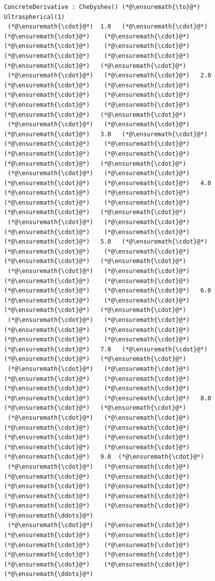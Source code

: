 \documentclass[12pt,a4paper]{article}
\begin{document}
\begin{lstlisting}
ConcreteDerivative : Chebyshev() (*@\ensuremath{\to}@*) Ultraspherical(1)
 (*@\ensuremath{\cdot}@*)  1.0   (*@\ensuremath{\cdot}@*)    (*@\ensuremath{\cdot}@*)    (*@\ensuremath{\cdot}@*)    (*@\ensuremath{\cdot}@*)    (*@\ensuremath{\cdot}@*)    (*@\ensuremath{\cdot}@*)    (*@\ensuremath{\cdot}@*)    (*@\ensuremath{\cdot}@*)   (*@\ensuremath{\cdot}@*)
 (*@\ensuremath{\cdot}@*)   (*@\ensuremath{\cdot}@*)   2.0   (*@\ensuremath{\cdot}@*)    (*@\ensuremath{\cdot}@*)    (*@\ensuremath{\cdot}@*)    (*@\ensuremath{\cdot}@*)    (*@\ensuremath{\cdot}@*)    (*@\ensuremath{\cdot}@*)    (*@\ensuremath{\cdot}@*)   (*@\ensuremath{\cdot}@*)
 (*@\ensuremath{\cdot}@*)   (*@\ensuremath{\cdot}@*)    (*@\ensuremath{\cdot}@*)   3.0   (*@\ensuremath{\cdot}@*)    (*@\ensuremath{\cdot}@*)    (*@\ensuremath{\cdot}@*)    (*@\ensuremath{\cdot}@*)    (*@\ensuremath{\cdot}@*)    (*@\ensuremath{\cdot}@*)   (*@\ensuremath{\cdot}@*)
 (*@\ensuremath{\cdot}@*)   (*@\ensuremath{\cdot}@*)    (*@\ensuremath{\cdot}@*)    (*@\ensuremath{\cdot}@*)   4.0   (*@\ensuremath{\cdot}@*)    (*@\ensuremath{\cdot}@*)    (*@\ensuremath{\cdot}@*)    (*@\ensuremath{\cdot}@*)    (*@\ensuremath{\cdot}@*)   (*@\ensuremath{\cdot}@*)
 (*@\ensuremath{\cdot}@*)   (*@\ensuremath{\cdot}@*)    (*@\ensuremath{\cdot}@*)    (*@\ensuremath{\cdot}@*)    (*@\ensuremath{\cdot}@*)   5.0   (*@\ensuremath{\cdot}@*)    (*@\ensuremath{\cdot}@*)    (*@\ensuremath{\cdot}@*)    (*@\ensuremath{\cdot}@*)   (*@\ensuremath{\cdot}@*)
 (*@\ensuremath{\cdot}@*)   (*@\ensuremath{\cdot}@*)    (*@\ensuremath{\cdot}@*)    (*@\ensuremath{\cdot}@*)    (*@\ensuremath{\cdot}@*)    (*@\ensuremath{\cdot}@*)   6.0   (*@\ensuremath{\cdot}@*)    (*@\ensuremath{\cdot}@*)    (*@\ensuremath{\cdot}@*)   (*@\ensuremath{\cdot}@*)
 (*@\ensuremath{\cdot}@*)   (*@\ensuremath{\cdot}@*)    (*@\ensuremath{\cdot}@*)    (*@\ensuremath{\cdot}@*)    (*@\ensuremath{\cdot}@*)    (*@\ensuremath{\cdot}@*)    (*@\ensuremath{\cdot}@*)   7.0   (*@\ensuremath{\cdot}@*)    (*@\ensuremath{\cdot}@*)   (*@\ensuremath{\cdot}@*)
 (*@\ensuremath{\cdot}@*)   (*@\ensuremath{\cdot}@*)    (*@\ensuremath{\cdot}@*)    (*@\ensuremath{\cdot}@*)    (*@\ensuremath{\cdot}@*)    (*@\ensuremath{\cdot}@*)    (*@\ensuremath{\cdot}@*)    (*@\ensuremath{\cdot}@*)   8.0   (*@\ensuremath{\cdot}@*)   (*@\ensuremath{\cdot}@*)
 (*@\ensuremath{\cdot}@*)   (*@\ensuremath{\cdot}@*)    (*@\ensuremath{\cdot}@*)    (*@\ensuremath{\cdot}@*)    (*@\ensuremath{\cdot}@*)    (*@\ensuremath{\cdot}@*)    (*@\ensuremath{\cdot}@*)    (*@\ensuremath{\cdot}@*)    (*@\ensuremath{\cdot}@*)   9.0  (*@\ensuremath{\cdot}@*)
 (*@\ensuremath{\cdot}@*)   (*@\ensuremath{\cdot}@*)    (*@\ensuremath{\cdot}@*)    (*@\ensuremath{\cdot}@*)    (*@\ensuremath{\cdot}@*)    (*@\ensuremath{\cdot}@*)    (*@\ensuremath{\cdot}@*)    (*@\ensuremath{\cdot}@*)    (*@\ensuremath{\cdot}@*)    (*@\ensuremath{\cdot}@*)   (*@\ensuremath{\ddots}@*)
 (*@\ensuremath{\cdot}@*)   (*@\ensuremath{\cdot}@*)    (*@\ensuremath{\cdot}@*)    (*@\ensuremath{\cdot}@*)    (*@\ensuremath{\cdot}@*)    (*@\ensuremath{\cdot}@*)    (*@\ensuremath{\cdot}@*)    (*@\ensuremath{\cdot}@*)    (*@\ensuremath{\cdot}@*)    (*@\ensuremath{\cdot}@*)   (*@\ensuremath{\ddots}@*)
\end{lstlisting}
\end{document}
